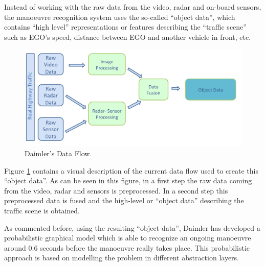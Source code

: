 Instead of working with the raw data from the video, radar and on-board sensors, the manoeuvre recognition system uses the so-called ``object data'', which contains ``high level'' representations or features describing the ``traffic scene'' such as EGO's speed, distance between EGO and another vehicle in front, etc.  
\begin{figure}
\begin{center}
\includegraphics[scale=0.35]{./figures/DaimlerDataFlow}
\caption{\label{Figure:DaimlerDataFlow} Daimler's Data Flow.}
\end{center}
\end{figure}

Figure \ref{Figure:DaimlerDataFlow} contains a visual description of the current data flow used to create this ``object data''.  As can be seen in this figure, in a first step the raw data coming from the video, radar and sensors is preprocessed. In a second step this preprocessed data is fused and the high-level or ``object data'' describing the traffic scene is obtained. 

As commented before, using the resulting ``object data'', Daimler has developed a probabilistic graphical model \cite{kasper2012object} which is able to recognize an ongoing manoeuvre around 0.6 seconds before the manoeuvre really takes place.  This probabilistic approach is based on modelling the problem in different abstraction layers. 


%
%
%

